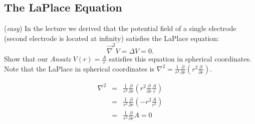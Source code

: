 \subsection{The LaPlace Equation}
(\textit{easy}) In the lecture we derived that the potential field of a single electrode (second electrode is located at infinity) satisfies the LaPlace equation:
$$
\vec \nabla^2 V = \Delta V = 0.
$$
Show that our \textit{Ansatz} $V(r) = \frac{A}{r}$ satisfies this equation in spherical coordinates. Note that the LaPlace in spherical coordinates is $\nabla^2 = \frac{1}{r^2}\frac{\partial }{\partial r}\left(r^2\frac{\partial }{\partial r}\right)$.

\ifanswers
    \begin{tcolorbox}[enhanced jigsaw,breakable,pad at break*=1mm,
    colback=blue!5!white,colframe=babyblueeyes,title=Solutions,
    watermark color=white]
    \begin{eqnarray*}
    \nabla^2 &=& \frac{1}{r^2}\frac{\partial }{\partial r}\left(r^2\frac{\partial }{\partial r}\frac{A}{r}\right)   \\
    &=& \frac{1}{r^2}\frac{\partial }{\partial r}\left(-r^2 \frac{A}{r^2}\right) \\
    &=& \frac{1}{r^2}\frac{\partial }{\partial r} A = 0
    \end{eqnarray*}
    \end{tcolorbox}
\fi